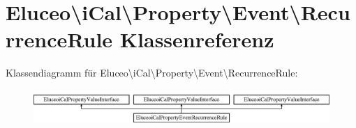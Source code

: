 \hypertarget{class_eluceo_1_1i_cal_1_1_property_1_1_event_1_1_recurrence_rule}{}\section{Eluceo\textbackslash{}i\+Cal\textbackslash{}Property\textbackslash{}Event\textbackslash{}Recurrence\+Rule Klassenreferenz}
\label{class_eluceo_1_1i_cal_1_1_property_1_1_event_1_1_recurrence_rule}
Klassendiagramm für Eluceo\textbackslash{}i\+Cal\textbackslash{}Property\textbackslash{}Event\textbackslash{}Recurrence\+Rule\+:\begin{figure}[H]
\begin{center}
\leavevmode
\includegraphics[height=1.382716cm]{class_eluceo_1_1i_cal_1_1_property_1_1_event_1_1_recurrence_rule}
\end{center}
\end{figure}
